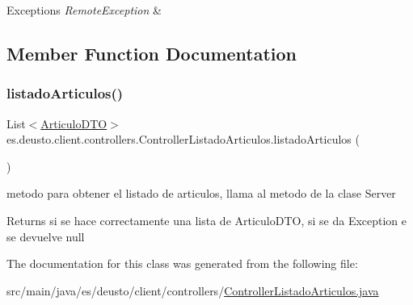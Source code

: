 \begin{DoxyExceptions}{Exceptions}
{\em Remote\+Exception} & \\
\hline
\end{DoxyExceptions}


\subsection{Member Function Documentation}
\mbox{\label{classes_1_1deusto_1_1client_1_1controllers_1_1_controller_listado_articulos_a04a9aa315bc43a2d6ac62cea16277f26}} 
\subsubsection{\texorpdfstring{listadoArticulos()}{listadoArticulos()}}
{\footnotesize\ttfamily List$<$\mbox{\hyperlink{classes_1_1deusto_1_1server_1_1dto_1_1_articulo_d_t_o}{Articulo\+D\+TO}}$>$ es.\+deusto.\+client.\+controllers.\+Controller\+Listado\+Articulos.\+listado\+Articulos (\begin{DoxyParamCaption}{ }\end{DoxyParamCaption})}

metodo para obtener el listado de articulos, llama al metodo de la clase Server \begin{DoxyReturn}{Returns}
si se hace correctamente una lista de Articulo\+D\+TO, si se da Exception e se devuelve null 
\end{DoxyReturn}


The documentation for this class was generated from the following file\+:\begin{DoxyCompactItemize}
\item 
src/main/java/es/deusto/client/controllers/\mbox{\hyperlink{_controller_listado_articulos_8java}{Controller\+Listado\+Articulos.\+java}}\end{DoxyCompactItemize}
